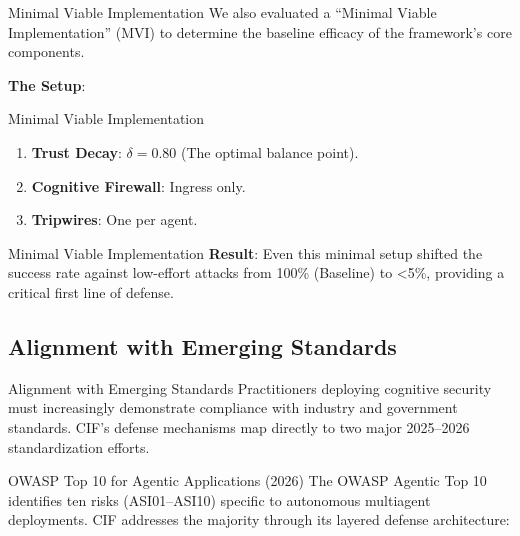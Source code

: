 \documentclass[
  ignorenonframetext,
]{beamer}
\providecommand{\tightlist}{%
  \setlength{\itemsep}{0pt}\setlength{\parskip}{0pt}}
\begin{document}
\begin{frame}[allowframebreaks]{Minimal Viable Implementation}
We also evaluated a ``Minimal Viable Implementation'' (MVI) to determine
the baseline efficacy of the framework's core components.

\textbf{The Setup}:

\end{frame}

\begin{frame}[allowframebreaks]{Minimal Viable Implementation}
\begin{enumerate}
\tightlist
\item
  \textbf{Trust Decay}: \(\delta = 0.80\) (The optimal balance point).
\item
  \textbf{Cognitive Firewall}: Ingress only.
\item
  \textbf{Tripwires}: One per agent.
\end{enumerate}

\end{frame}

\begin{frame}[allowframebreaks]{Minimal Viable Implementation}
\textbf{Result}: Even this minimal setup shifted the success rate
against low-effort attacks from 100\% (Baseline) to \textless5\%,
providing a critical first line of defense.
\end{frame}

\begin{frame}
\end{frame}

\subsection{Alignment with Emerging
Standards}\label{alignment-with-emerging-standards}

\begin{frame}[allowframebreaks]{Alignment with Emerging Standards}
Practitioners deploying cognitive security must increasingly demonstrate
compliance with industry and government standards. CIF's defense
mechanisms map directly to two major 2025--2026 standardization efforts.
\end{frame}

\begin{frame}[allowframebreaks]{OWASP Top 10 for Agentic Applications
(2026)}
\protect{}\label{owasp-top-10-for-agentic-applications-2026}
The OWASP Agentic Top 10 identifies ten risks (ASI01--ASI10) specific to
autonomous multiagent deployments. CIF addresses the majority through
its layered defense architecture:

\end{frame}
\end{document}
